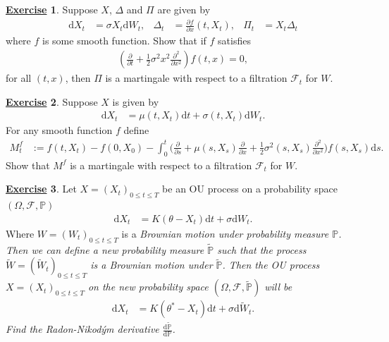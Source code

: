 \documentclass[12pt]{book}
\numberwithin{equation}{chapter}
\theoremstyle{plain}
\numberwithin{theorem}{section}
\theoremstyle{definition}
\newtheorem{exercise}{\underline{Exercise}}
\numberwithin{exercise}{chapter}
\newcommand{\<}{\langle}
\renewcommand{\>}{\rangle}
\renewcommand{\(}{\left(}
\renewcommand{\)}{\right)}
\renewcommand{\[}{\left[}
\renewcommand{\]}{\right]}
\newcommand\Pb{\mathds{P}}
\newcommand\Fc{\mathscr{F}}
\newcommand\sig{\sigma}
\newcommand\Del{\Delta}
\renewcommand\d{\partial}
\newcommand\dd{\mathrm{d}}
\begin{document}
\begin{exercise}
\label{exer:8.3}
Suppose $X$, $\Del$ and $\Pi$ are given by 
\begin{align}
\dd X_t
	&=	\sig X_t \dd W_t , &
\Del_t
	&=	\frac{ \d f}{\d x}(t,X_t) , &
\Pi_t
	&=	X_t \Del_t
\end{align}
where $f$ is some smooth function.  Show that if $f$ satisfies
\begin{align}
\( \frac{\d}{\d t} + \frac{1}{2}\sig^2 x^2 \frac{\d^2}{\d x^2} \) f(t,x) = 0 ,
\end{align}
for all $(t,x)$, then $\Pi$ is a martingale with respect to a filtration $\Fc_t$ for $W$.
\end{exercise}

\begin{exercise}
\label{exer:8.4}
Suppose $X$ is given by
\begin{align}
\dd X_t
	&=	\mu(t,X_t) \dd t + \sig(t,X_t) \dd W_t .
\end{align}
For any smooth function $f$ define
\begin{align}
M_t^f
	&:=	f(t,X_t) - f(0,X_0) - \int_0^t \Big( \frac{\d}{\d s} + \mu(s,X_s)\frac{\d}{\d x} + \frac{1}{2} \sig^2(s,X_s) \frac{\d^2}{\d x^2} \Big) f(s,X_s) \dd s .
\end{align}
Show that $M^f$ is a martingale with respect to a filtration $\Fc_t$ for $W$.
\end{exercise}

\begin{exercise}
\label{exer:8.5}
Let $X = (X_t)_{0 \leq t \leq T}$ be an OU process on a probability space $(\Omega, \Fc, \Pb)$ 
\begin{align}
\dd X_t
	&=	K(\theta - X_t)\dd t + \sigma \dd W_t .
\end{align}
Where $W=(W_t)_{0 \leq t \leq T}$ is a \em Brownian motion \em  under probability measure $\Pb$. Then we can define a new probability measure $\widetilde{\Pb}$ such that the process $\widetilde{W} =(\widetilde{W}_t )_{0\leq t \leq T}$ is a \em Brownian motion \em under $\widetilde{\Pb}$. Then the OU process $X = (X_t)_{0 \leq t \leq T}$ on the new probability space $(\Omega, \Fc, \widetilde{\Pb})$  will be
\begin{align}
\dd X_t
	&=	K(\theta^* - X_t)\dd t + \sigma \dd \widetilde{W}_t  .
\end{align}
Find the \em Radon-Nikod\'ym \em derivative $\frac{\dd \widetilde{\Pb} }{\dd \Pb }$.
\end{exercise}
\end{document}
